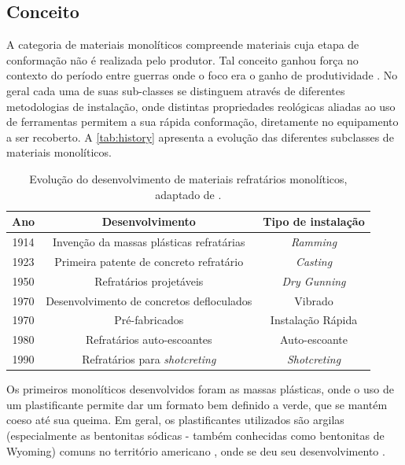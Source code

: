     \subsection{Conceito}
  	A categoria de materiais monolíticos compreende materiais cuja etapa de
    conformação não é realizada pelo produtor. Tal conceito ganhou força no
    contexto do período entre guerras onde o foco era o ganho de produtividade
    \cite{Schacht2004}. No geral cada uma de suas sub-classes se distinguem
    através de diferentes metodologias de instalação, onde distintas
    propriedades reológicas aliadas ao uso de ferramentas permitem a sua rápida conformação, diretamente no equipamento a ser recoberto. A \autoref{tab:history} apresenta a evolução das diferentes subclasses de materiais monolíticos.
\begin{table}[!h] 
\centering
\caption{Evolução do desenvolvimento de materiais refratários monolíticos, adaptado de \cite{Schacht2004}.}
\begin{tabular}{ccc}
\hline
Ano  & Desenvolvimento                                         & Tipo de instalação                    \\
\hline
\hline
1914 & Invenção da massas plásticas refratárias                & \textit{Ramming}     \\ \hline
1923 & Primeira patente de concreto refratário                 & \textit{Casting}     \\ \hline
1950 & Refratários projetáveis                                 & \textit{Dry Gunning} \\ \hline
1970 & Desenvolvimento de concretos defloculados               & Vibrado                               \\ \hline
1970 & Pré-fabricados                                          & Instalação Rápida                     \\ \hline
1980 & Refratários auto-escoantes                              & Auto-escoante                         \\ \hline
1990 & Refratários para  \textit{shotcreting} & \textit{Shotcreting} \\ \hline
\end{tabular}
\label{tab:history}
\end{table}

	Os primeiros monolíticos desenvolvidos foram as massas plásticas, onde o uso
  de um plastificante permite dar um formato bem definido a verde, que se mantém
  coeso até sua queima. Em geral, os plastificantes utilizados são argilas
  (especialmente as bentonitas sódicas  - também conhecidas como bentonitas de
  Wyoming) comuns no território americano \cite{bergaya2006general}, onde se deu seu desenvolvimento \cite{Schacht2004}.
    
